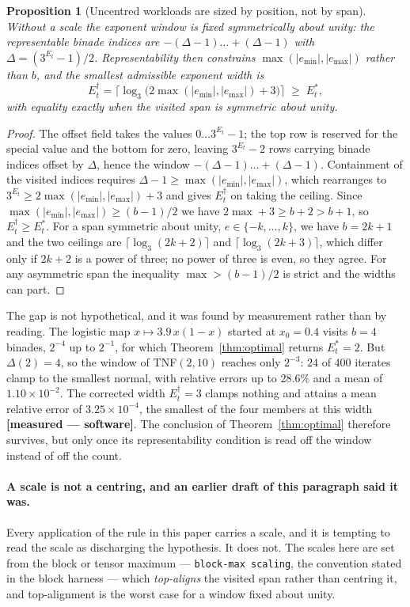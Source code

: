\documentclass[11pt]{article}
\newtheorem{proposition}[theorem]{Proposition}
\theoremstyle{definition}
\begin{document}
\begin{proposition}[Uncentred workloads are sized by position, not by span]
\label{prop:uncentred}
Without a scale the exponent window is fixed symmetrically about unity: the
representable binade indices are $-(\Delta-1) \dots +(\Delta-1)$ with
$\Delta = (3^{E_t}-1)/2$. Representability then constrains
$\max(|e_{\min}|,|e_{\max}|)$ rather than $b$, and the smallest admissible
exponent width is
\[
  E_t^{\dagger} = \bigl\lceil \log_3\bigl(2\max(|e_{\min}|,|e_{\max}|)+3\bigr) \bigr\rceil
  \;\ge\; E_t^{*},
\]
with equality exactly when the visited span is symmetric about unity.
\end{proposition}
\begin{proof}
The offset field takes the values $0 \dots 3^{E_t}-1$; the top row is reserved for
the special value and the bottom for zero, leaving $3^{E_t}-2$ rows carrying
binade indices offset by $\Delta$, hence the window $-(\Delta-1) \dots +(\Delta-1)$.
Containment of the visited indices requires $\Delta-1 \ge \max(|e_{\min}|,|e_{\max}|)$,
which rearranges to $3^{E_t} \ge 2\max(|e_{\min}|,|e_{\max}|)+3$ and gives
$E_t^{\dagger}$ on taking the ceiling. Since
$\max(|e_{\min}|,|e_{\max}|) \ge (b-1)/2$ we have $2\max+3 \ge b+2 > b+1$, so
$E_t^{\dagger} \ge E_t^{*}$. For a span symmetric about unity,
$e \in \{-k,\dots,k\}$, we have $b=2k+1$ and the two ceilings are
$\lceil\log_3(2k+2)\rceil$ and $\lceil\log_3(2k+3)\rceil$, which differ only if
$2k+2$ is a power of three; no power of three is even, so they agree. For any
asymmetric span the inequality $\max > (b-1)/2$ is strict and the widths can part.
\end{proof}

The gap is not hypothetical, and it was found by measurement rather than by
reading. The logistic map $x \mapsto 3.9\,x(1-x)$ started at $x_0 = 0.4$ visits
$b=4$ binades, $2^{-4}$ up to $2^{-1}$, for which Theorem~\ref{thm:optimal}
returns $E_t^{*}=2$. But $\Delta(2)=4$, so the window of TNF$(2,10)$ reaches only
$2^{-3}$: $24$ of $400$ iterates clamp to the smallest normal, with relative
errors up to $28.6\%$ and a mean of $1.10\times10^{-2}$. The corrected width
$E_t^{\dagger}=3$ clamps nothing and attains a mean relative error of
$3.25\times10^{-4}$, the smallest of the four members at this width
\textbf{[measured --- software]}. The conclusion of Theorem~\ref{thm:optimal}
therefore survives, but only once its representability condition is read off the
window instead of off the count.

\paragraph{A scale is not a centring, and an earlier draft of this paragraph said
it was.} Every application of the rule in this paper carries a scale, and it is
tempting to read the scale as discharging the hypothesis. It does not. The scales
here are set from the block or tensor maximum --- \texttt{block-max scaling}, the
convention stated in the block harness --- which \emph{top-aligns} the visited
span rather than centring it, and top-alignment is the worst case for a window
fixed about unity.
\end{document}
